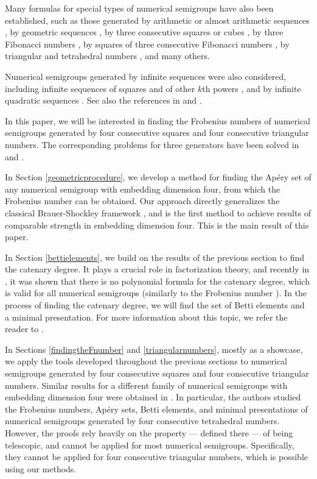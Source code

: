 \documentclass[12pt]{article}
\theoremstyle{remark}
\begin{document}
Many formulas for special types of numerical semigroups have also been established, such as those generated by arithmetic \cite{Brauer1942,Roberts1956} or almost arithmetic sequences \cite{Lewin1975,Selmer1977}, by geometric sequences \cite{Ong2008}, by three consecutive squares or cubes \cite{Felsquaresandcubes,Lepilov2015}, by three Fibonacci numbers \cite{Marin2007}, by squares of three consecutive Fibonacci numbers \cite{Fibsquares2025}, by triangular and tetrahedral numbers \cite{triangular}, and many others.

Numerical semigroups generated by infinite sequences were also considered, including infinite sequences of squares \cite{Moscariello2015} and of other $k$th powers \cite{Arias2025}, and by infinite quadratic sequences \cite{quadraticseq}. See also the references in \cite{Arias2025} and  \cite{quadraticseq}.



In this paper, we will be interested in finding the Frobenius numbers of numerical semigroups generated by four consecutive squares and four consecutive triangular numbers. The corresponding problems for three generators have been solved in \cite{Felsquaresandcubes,Lepilov2015} and \cite{triangular}.  

In Section \ref{geometricprocedure}, we develop a method for finding the Ap{\'e}ry set of any numerical semigroup with embedding dimension four, from which the Frobenius number can be obtained. Our approach directly generalizes the classical Brauer-Shockley framework \cite{Brauer1962}, and is the first method to achieve results of comparable strength in embedding dimension four. This is the main result of this paper. 

In Section \ref{bettielements}, we build on the results of the previous section to find the catenary degree. It plays a crucial role in factorization theory, and recently in \cite{Geroldinger2025}, it was shown that there is no polynomial formula for the catenary degree, which is valid for all numerical semigroups (similarly to the Frobenius number \cite{Curtis1990}). In the process of finding the catenary degree, we will find the set of Betti elements and a minimal presentation.
For more information about this topic, we refer the reader to \cite[Chapter 6]{AssiDAnnaGarciaSanchez2020}. 

In Sections \ref{findingtheFnumber} and \ref{triangularnumbers}, mostly as a showcase, we apply the tools developed throughout the previous sections to numerical semigroups generated by four consecutive squares and four consecutive triangular numbers. Similar results for a different family of numerical semigroups with embedding dimension four were obtained in \cite{triangular}. In particular, the authors studied the Frobenius numbers, Ap{\'e}ry sets, Betti elements, and minimal presentations of numerical semigroups generated by four consecutive tetrahedral numbers. However, the proofs rely heavily on the property --- defined there --- of being telescopic, and cannot be applied for most numerical semigroups. Specifically, they cannot be applied for four consecutive triangular numbers, which is possible using our methods.
\end{document}
